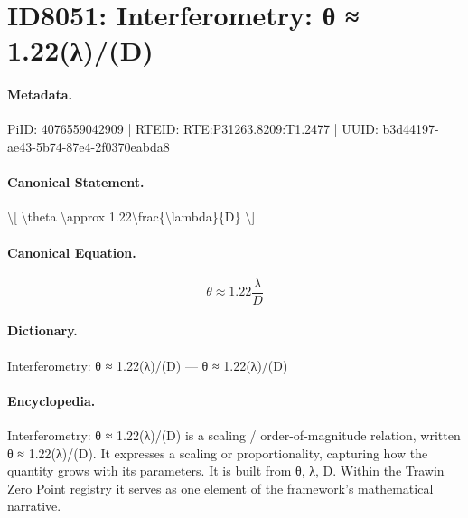 \section*{ID8051: Interferometry: θ ≈ 1.22(λ)/(D)}
\paragraph{Metadata.}
PiID: 4076559042909 | RTEID: RTE:P31263.8209:T1.2477 | UUID: b3d44197-ae43-5b74-87e4-2f0370eabda8

\paragraph{Canonical Statement.}
\textbackslash{}[ \textbackslash{}theta \textbackslash{}approx 1.22\textbackslash{}frac\{\textbackslash{}lambda\}\{D\} \textbackslash{}]

\paragraph{Canonical Equation.}
\[
\theta \approx 1.22\frac{\lambda}{D}
\]

\paragraph{Dictionary.}
Interferometry: θ ≈ 1.22(λ)/(D) — θ ≈ 1.22(λ)/(D)

\paragraph{Encyclopedia.}
Interferometry: θ ≈ 1.22(λ)/(D) is a scaling / order-of-magnitude relation, written θ ≈ 1.22(λ)/(D). It expresses a scaling or proportionality, capturing how the quantity grows with its parameters. It is built from θ, λ, D. Within the Trawin Zero Point registry it serves as one element of the framework's mathematical narrative.
